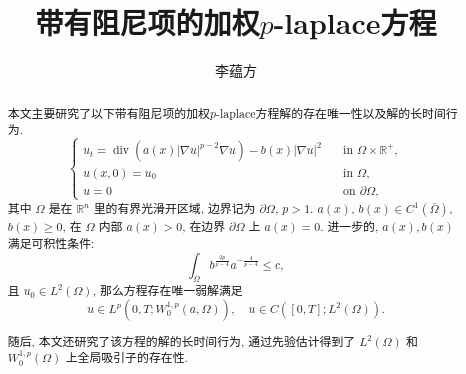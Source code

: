 \documentclass[oneside,longtitle]{LZUthesis}
\numberwithin{equation}{chapter}
\newcommand*\abs[1]{\lvert#1\rvert}
\newcommand\R{\mathbb{R}}
\DeclareMathOperator{\Div}{div}
\begin{document}
\classification{}

\confidential{}

\title{带有阻尼项的加权$p$-laplace方程}




\author{李蕴方}






\submitdate{}


\degreedate{}


\maketitle

\makestatement

\frontmatter{}

\begin{abstract}
	本文主要研究了以下带有阻尼项的加权$p$-laplace方程解的存在唯一性以及解的长时间行为.
	\begin{equation*}
		\begin{cases}
			u_t = \Div(a(x)\abs{\nabla u}^{p-2}\nabla u) - b(x)\abs{\nabla u}^2 \quad &\text{in } \Omega \times \R^+,\\
			u(x,0) = u_0 \quad &\text{in } \Omega,\\
			u = 0 \quad &\text{on } \partial\Omega,
		\end{cases}
	\end{equation*}
	其中 $\Omega$ 是在 $\R^{n}$ 里的有界光滑开区域, 边界记为 $\partial\Omega$, $p>1$.
	$ a(x)$, $b(x) \in C^1(\bar{\Omega}) $, $b(x) \geq 0$, 在 $\Omega$ 内部 $a(x) > 0$, 在边界 $\partial\Omega$ 上 $a(x) = 0$.
	进一步的, $a(x), b(x)$ 满足可积性条件:
	\begin{equation*}
		\int_{\Omega} b^{\frac{2p}{p-4}}a^{-\frac{4}{p-4}} \leq c,
	\end{equation*}
	且 $u_0 \in L^2(\Omega) $, 那么方程存在唯一弱解满足
	\begin{equation*}
		u \in L^p(0, T; W_0^{1,p}(a,\Omega)), \quad u \in C([0, T]; L^2(\Omega)).
	\end{equation*}

	随后, 本文还研究了该方程的解的长时间行为, 通过先验估计得到了 $L^2(\Omega)$ 和 $W_0^{1,p}(\Omega)$ 上全局吸引子的存在性.
\end{abstract}
\end{document}
